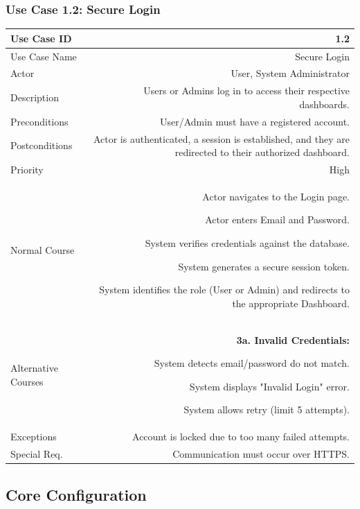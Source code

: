 \subsubsection{Use Case 1.2: Secure Login}
\begin{tabularx}{\textwidth}{|L|R|}
	\hline
	Use Case ID & 1.2 \\ \hline
	Use Case Name & Secure Login \\ \hline
	Actor & User, System Administrator \\ \hline
	Description & Users or Admins log in to access their respective dashboards. \\ \hline
	Preconditions & User/Admin must have a registered account. \\ \hline
	Postconditions & Actor is authenticated, a session is established, and they are redirected to their authorized dashboard. \\ \hline
	Priority & High \\ \hline
	Normal Course & 
	\begin{normalsteps}
		\item Actor navigates to the Login page.
		\item Actor enters Email and Password.
		\item System verifies credentials against the database.
		\item System generates a secure session token.
		\item System identifies the role (User or Admin) and redirects to the appropriate Dashboard.
	\end{normalsteps} \\ \hline
	Alternative Courses & 
	\textbf{3a. Invalid Credentials:} 
	\begin{altsteps}
		\item System detects email/password do not match.
		\item System displays "Invalid Login" error.
		\item System allows retry (limit 5 attempts).
	\end{altsteps} \\ \hline
	Exceptions & Account is locked due to too many failed attempts. \\ \hline
	Special Req. & Communication must occur over HTTPS. \\ \hline
\end{tabularx}

\newpage

\subsection{Core Configuration}

